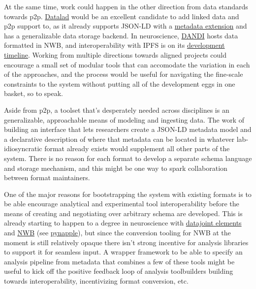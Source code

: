At the same time, work could happen in the other direction from data
standards towards p2p. \href{https://www.datalad.org/}{Datalad} \citep{halchenkoDataLadDistributedSystem2021}  would be an excellent
candidate to add linked data and p2p support to, as it already supports
JSON-LD with a \href{http://docs.datalad.org/projects/metalad/}{metadata
extension} and has a generalizable data storage backend. In
neuroscience, \href{https://dandiarchive.org/}{DANDI} hosts data
formatted in NWB, and interoperability with IPFS is on its
\href{https://www.dandiarchive.org/\#proposed-dandi-timeline}{development
timeline}. Working from multiple directions towards aligned projects
could encourage a small set of modular tools that can accomodate the
variation in each of the approaches, and the process would be useful for
navigating the fine-scale constraints to the system without putting all
of the development eggs in one basket, so to speak.

Aside from p2p, a toolset that's desperately needed across disciplines
is an generalizable, approachable means of modeling and ingesting data.
The work of building an interface that lets researchers create a JSON-LD
metadata model and a declarative description of where that metadata can
be located in whatever lab-idiosyncratic format already exists would
supplement all other parts of the system. There is no reason for each
format to develop a separate schema language and storage mechanism, and
this might be one way to spark collaboration between format maintainers.

One of the major reasons for bootstrapping the system with existing
formats is to be able encourage analytical and experimental tool
interoperability before the means of creating and negotiating over
arbitrary schema are developed. This is already starting to happen to a
degree in neuroscience with
\href{https://elements.datajoint.org/}{datajoint elements} \citep{yatsenkoDataJointElementsData2021}  and
\href{https://nwb-overview.readthedocs.io/en/latest/tools/tools_home.html}{NWB}
(see \href{https://github.com/PeyracheLab/pynapple/}{pynapple}), but
since the conversion tooling for NWB at the moment is still relatively
opaque there isn't strong incentive for analysis libraries to support it
for seamless input. A wrapper framework to be able to specify an
analysis pipeline from metadata that combines a few of these tools might
be useful to kick off the positive feedback loop of analysis
toolbuilders building towards interoperability, incentivizing format
conversion, etc.

